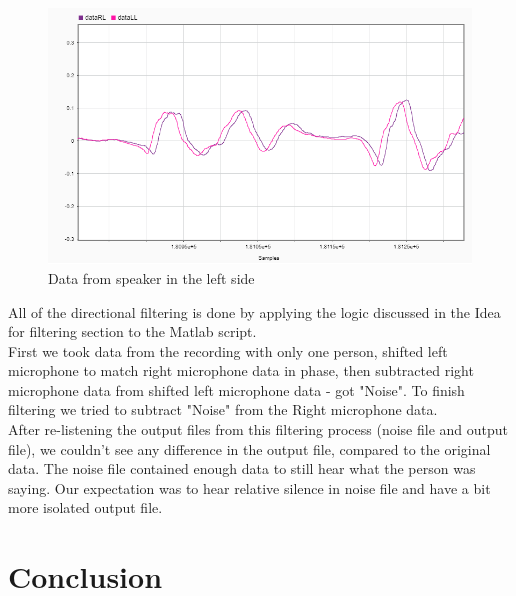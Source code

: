  
\begin{figure}[htp]
  \centering
  \includegraphics[width=0.75\linewidth]{Illustrations/DataL.png}
  \caption{Data from speaker in the left side}
  \label{fig:L}
\end{figure}

 

All of the directional filtering is done by applying the logic discussed in the Idea for filtering section to 
the Matlab script.\\
First we took data from the recording with only one person, shifted left microphone to match right microphone 
data in phase, then subtracted right microphone data from shifted left microphone data - got "Noise". To 
finish filtering we tried to subtract "Noise" from the Right microphone data.\\
After re-listening the output files from this filtering process (noise file and output file), we couldn't see 
any difference in the output file, compared to the original data. The noise file contained enough data to 
still hear what the person was saying. Our expectation was to hear relative silence in noise file and have a 
bit more isolated output file.


 

\section{Conclusion}